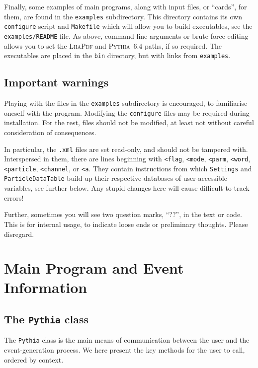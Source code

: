 \documentclass{elsartmod}
\begin{document}
Finally, some examples of main programs, along with input files, or
``cards'', for them, are found in the \texttt{examples}
subdirectory. This directory contains its own 
\texttt{configure} script and \texttt{Makefile} which will allow you 
to build executables, see the \texttt{examples/README} file. 
As above, command-line arguments or brute-force editing allows you
to set the \textsc{LhaPdf} and \textsc{Pythia}~6.4 paths, if so required.
The executables are placed in the \texttt{bin} directory, but with 
links from \texttt{examples}.  

\subsection{Important warnings}

Playing with the files in the \texttt{examples} subdirectory is
encouraged, to familiarise oneself with the program. Modifying the
\texttt{configure} files may be required during installation. For 
the rest, files should not be modified, at least not without 
careful consideration of consequences.
 
In particular, the \texttt{.xml} files are set read-only, and should 
not be tampered with. Interspersed in them, there are lines beginning 
with \texttt{<flag}, \texttt{<mode}, \texttt{<parm}, \texttt{<word}, 
\texttt{<particle}, \texttt{<channel}, or \texttt{<a}. They contain 
instructions from which \texttt{Settings} and \texttt{ParticleDataTable} 
build up their respective databases of user-accessible variables, 
see further below. Any stupid changes here will cause 
difficult-to-track errors!

Further, sometimes you will see two question marks, ``??'', in the 
text or code. This is for internal usage, to indicate loose ends or 
preliminary thoughts. Please disregard.

\section{Main Program and Event Information \label{sec:main}}

\subsection{The \texttt{Pythia} class}

The \texttt{Pythia} class is the main means of communication between
the user and the event-generation process. We here present the key
methods for the user to call, ordered by context. 
\end{document}
